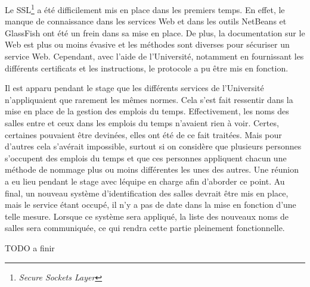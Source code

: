 Le SSL\protect\footnote{\textit{Secure Sockets Layer}} a \'et\'e difficilement mis en place dans les premiers temps.
En effet, le manque de connaissance dans les services Web et dans les outils NetBeans et GlassFish ont \'et\'e un frein dans sa mise en place.
De plus, la documentation sur le Web est plus ou moins \'evasive et les m\'ethodes sont diverses pour s\'ecuriser un service Web.
Cependant, avec l'aide de l'Universit\'e, notamment en fournissant les diff\'erents certificats et les instructions, le protocole a pu \^etre mis en fonction.

Il est apparu pendant le stage que les diff\'erents services de l'Universit\'e n'appliquaient que rarement les m\^emes normes.
Cela s'est fait ressentir dans la mise en place de la gestion des emplois du temps.
Effectivement, les noms des salles entre {\YuukouII} et ceux dans les emplois du temps n'avaient rien \`a voir.
Certes, certaines pouvaient \^etre devin\'ees, elles ont \'et\'e de ce fait trait\'ees.
Mais pour d'autres cela s'av\'erait impossible, surtout si on consid\`ere que plusieurs personnes s'occupent des emplois du temps et que ces personnes appliquent chacun une m\'ethode de nommage plus ou moins diff\'erentes les unes des autres.
Une r\'eunion a eu lieu pendant le stage avec l\'equipe en charge afin d'aborder ce point.
Au final, un nouveau syst\`eme d'identification des salles devrait \^etre mis en place, mais le service \'etant occup\'e, il n'y a pas de date dans la mise en fonction d'une telle mesure.
Lorsque ce syst\`eme sera appliqu\'e, la liste des nouveaux noms de salles sera communiqu\'ee, ce qui rendra cette partie pleinement fonctionnelle.

TODO a finir



\clearpage
